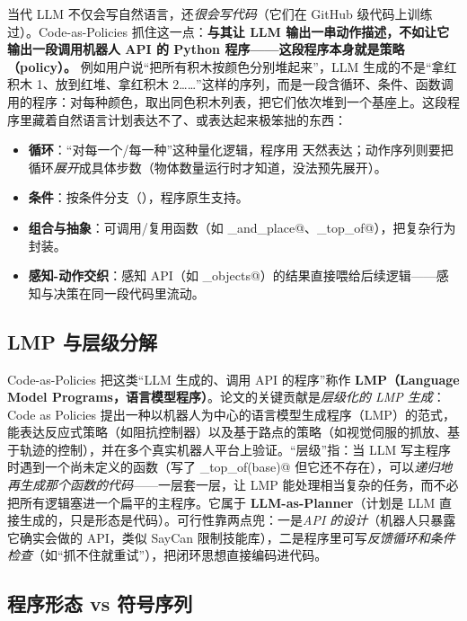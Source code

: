 当代 LLM 不仅会写自然语言，还\emph{很会写代码}（它们在 GitHub 级代码上训练过）。Code-as-Policies 抓住这一点：\textbf{与其让 LLM 输出一串动作描述，不如让它输出一段调用机器人 API 的 Python 程序——这段程序本身就是策略（policy）。} 例如用户说“把所有积木按颜色分别堆起来”，LLM 生成的不是“拿红积木 1、放到红堆、拿红积木 2……”这样的序列，而是一段含循环、条件、函数调用的程序：对每种颜色，取出同色积木列表，把它们依次堆到一个基座上。这段程序里藏着自然语言计划表达不了、或表达起来极笨拙的东西：

\begin{itemize}
  \item \textbf{循环}：“对每一个/每一种”这种量化逻辑，程序用 \verb@for@ 天然表达；动作序列则要把循环\emph{展开}成具体步数（物体数量运行时才知道，没法预先展开）。
  \item \textbf{条件}：按条件分支（\verb@if@），程序原生支持。
  \item \textbf{组合与抽象}：可调用/复用函数（如 \verb@pick_and_place@、\verb@on_top_of@），把复杂行为封装。
  \item \textbf{感知-动作交织}：感知 API（如 \verb@detect_objects@）的结果直接喂给后续逻辑——感知与决策在同一段代码里流动。
\end{itemize}

\subsection{LMP 与层级分解}
\label{sec:cap-lmp}

Code-as-Policies 把这类“LLM 生成的、调用 API 的程序”称作 \textbf{LMP（Language Model Programs，语言模型程序）}。论文的关键贡献是\emph{层级化的 LMP 生成}：Code as Policies 提出一种以机器人为中心的语言模型生成程序（LMP）的范式，能表达反应式策略（如阻抗控制器）以及基于路点的策略（如视觉伺服的抓放、基于轨迹的控制），并在多个真实机器人平台上验证\cite{liang2023codeaspolicies}。“层级”指：当 LLM 写主程序时遇到一个尚未定义的函数（写了 \verb@on_top_of(base)@ 但它还不存在），可以\emph{递归地再生成那个函数的代码}——一层套一层，让 LMP 能处理相当复杂的任务，而不必把所有逻辑塞进一个扁平的主程序。它属于 \textbf{LLM-as-Planner}（计划是 LLM 直接生成的，只是形态是代码）。可行性靠两点兜：一是\emph{API 的设计}（机器人只暴露它确实会做的 API，类似 SayCan 限制技能库），二是程序里可写\emph{反馈循环和条件检查}（如“抓不住就重试”），把闭环思想直接编码进代码。

\subsection{程序形态 vs 符号序列}
\label{sec:cap-compare}

